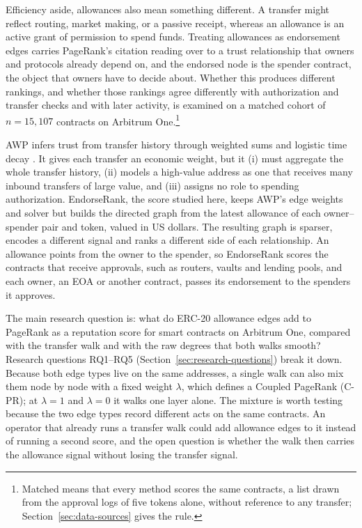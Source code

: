 Efficiency aside, allowances also mean something different. A transfer might reflect routing, market making, or a passive receipt, whereas an allowance is an active grant of permission to spend funds. Treating allowances as endorsement edges carries PageRank's citation reading \parencite{page1999pagerank} over to a trust relationship that owners and protocols already depend on, and the endorsed node is the spender contract, the object that owners have to decide about. Whether this produces different rankings, and whether those rankings agree differently with authorization and transfer checks and with later activity, is examined on a matched cohort of $n=15{,}107$ contracts on Arbitrum One.\footnote{Matched means that every method scores the same contracts, a list drawn from the approval logs of five tokens alone, without reference to any transfer; Section~\ref{sec:data-sources} gives the rule.}


AWP infers trust from transfer history through weighted sums and logistic time decay \parencite{do2023awp}. It gives each transfer an economic weight, but it (i) must aggregate the whole transfer history, (ii) models a high-value address as one that receives many inbound transfers of large value, and (iii) assigns no role to spending authorization. EndorseRank, the score studied here, keeps AWP's edge weights and solver but builds the directed graph from the latest allowance of each owner--spender pair and token, valued in US dollars. The resulting graph is sparser, encodes a different signal and ranks a different side of each relationship. An allowance points from the owner to the spender, so EndorseRank scores the contracts that receive approvals, such as routers, vaults and lending pools, and each owner, an EOA or another contract, passes its endorsement to the spenders it approves.

The main research question is: what do ERC-20 allowance edges add to PageRank as a reputation score for smart contracts on Arbitrum One, compared with the transfer walk and with the raw degrees that both walks smooth? Research questions RQ1--RQ5 (Section~\ref{sec:research-questions}) break it down. Because both edge types live on the same addresses, a single walk can also mix them node by node with a fixed weight $\lambda$, which defines a Coupled PageRank (C-PR); at $\lambda=1$ and $\lambda=0$ it walks one layer alone. The mixture is worth testing because the two edge types record different acts on the same contracts. An operator that already runs a transfer walk could add allowance edges to it instead of running a second score, and the open question is whether the walk then carries the allowance signal without losing the transfer signal.

